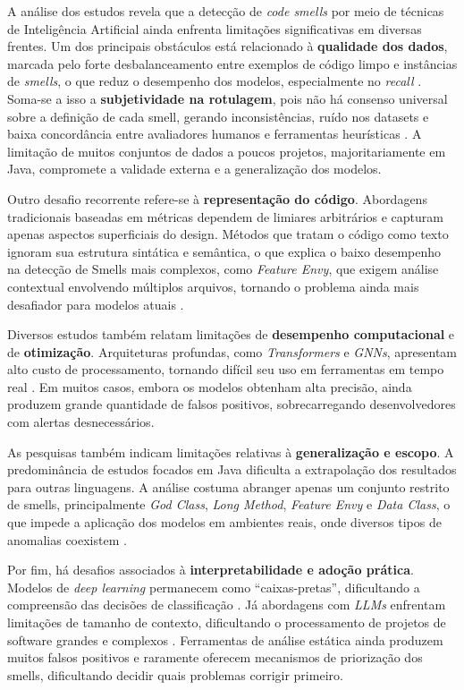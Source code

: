 {A análise dos estudos revela que a detecção de \textit{code smells} por meio de técnicas 
de Inteligência Artificial ainda enfrenta limitações significativas em diversas frentes. 
Um dos principais obstáculos está relacionado à \textbf{qualidade dos dados}, marcada 
pelo forte desbalanceamento entre exemplos de código limpo e instâncias de \textit{smells}, 
o que reduz o desempenho dos modelos, especialmente no \textit{recall} \cite{Khleel2022DeepCNNBadSmells}. Soma-se a isso a 
\textbf{subjetividade na rotulagem}, pois não há consenso universal sobre a definição de 
cada smell, gerando inconsistências, ruído nos datasets e baixa concordância entre 
avaliadores humanos e ferramentas heurísticas \cite{Ho2025EnseSmells}. A limitação de muitos conjuntos de dados 
a poucos projetos, majoritariamente em Java, compromete a validade externa e a 
generalização dos modelos.

Outro desafio recorrente refere-se à \textbf{representação do código}. Abordagens 
tradicionais baseadas em métricas dependem de limiares arbitrários e capturam apenas 
aspectos superficiais do design. Métodos que tratam o código como texto ignoram sua 
estrutura sintática e semântica, o que explica o baixo desempenho na detecção 
de Smells mais complexos, como \textit{Feature Envy}, que exigem análise contextual envolvendo 
múltiplos arquivos, tornando o problema ainda mais desafiador para modelos atuais \cite{Abdelkader2025SPNCodeSmells}.

Diversos estudos também relatam limitações de \textbf{desempenho computacional} e de 
\textbf{otimização}. Arquiteturas profundas, como \textit{Transformers} e \textit{GNNs}, apresentam alto 
custo de processamento, tornando difícil seu uso em ferramentas em tempo real \cite{Ali2025TransformerSmells}. 
Em muitos casos, embora os modelos obtenham alta precisão, ainda produzem grande quantidade de falsos positivos, 
sobrecarregando desenvolvedores com alertas desnecessários.

As pesquisas também indicam limitações relativas à \textbf{generalização e escopo}. A 
predominância de estudos focados em Java dificulta a extrapolação dos resultados para 
outras linguagens. A análise costuma abranger apenas um conjunto restrito de smells, 
principalmente \textit{God Class}, \textit{Long Method}, \textit{Feature Envy} e 
\textit{Data Class}, o que impede a aplicação dos modelos em ambientes reais, onde 
diversos tipos de anomalias coexistem \cite{Ali2025TransformerSmells}.

Por fim, há desafios associados à \textbf{interpretabilidade e adoção prática}. Modelos 
de \textit{deep learning} permanecem como “caixas-pretas”, dificultando a compreensão 
das decisões de classificação \cite{Rashid2025InterpretableDL}. Já abordagens com \textit{LLMs} enfrentam limitações de 
tamanho de contexto, dificultando o processamento de projetos de software grandes e complexos \cite{Baumgartner2024AIDrivenRefactoring}. Ferramentas de 
análise estática ainda produzem muitos falsos positivos e raramente oferecem mecanismos 
de priorização dos smells, dificultando decidir quais problemas corrigir primeiro.

}
